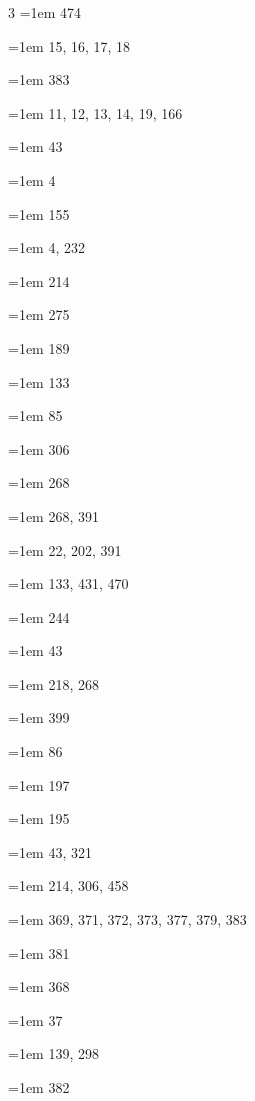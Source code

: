 \begin{multicols}{3}
\hangindent=1em  474\par
\hangindent=1em  15, 16, 17, 18\par
\hangindent=1em  383\par
\hangindent=1em  11, 12, 13, 14, 19, 166\par
\hangindent=1em  43\par
\hangindent=1em  4\par
\hangindent=1em  155\par
\hangindent=1em  4, 232\par
\hangindent=1em  214\par
\hangindent=1em  275\par
\hangindent=1em  189\par
\hangindent=1em  133\par
\hangindent=1em  85\par
\hangindent=1em  306\par
\hangindent=1em  268\par
\hangindent=1em  268, 391\par
\hangindent=1em  22, 202, 391\par
\hangindent=1em  133, 431, 470\par
\hangindent=1em  244\par
\hangindent=1em  43\par
\hangindent=1em  218, 268\par
\hangindent=1em  399\par
\hangindent=1em  86\par
\hangindent=1em  197\par
\hangindent=1em  195\par
\hangindent=1em  43, 321\par
\hangindent=1em  214, 306, 458\par
\hangindent=1em  369, 371, 372, 373, 377, 379, 383\par
\hangindent=1em  381\par
\hangindent=1em  368\par
\hangindent=1em  37\par
\hangindent=1em  139, 298\par
\hangindent=1em  382\par

\end{multicols}
